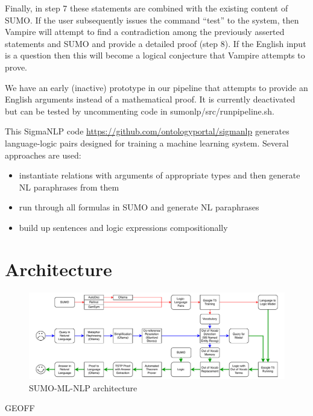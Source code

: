 \documentclass[runningheads]{llncs}
\begin{document}
Finally, in step 7 these statements are combined with the existing content of SUMO.   If the user subsequently issues the command ``test'' to the system, then Vampire will attempt to find a contradiction among the previously asserted statements and SUMO and provide a detailed proof (step 8).  If the English input is a question then this will become a logical conjecture that Vampire attempts to prove.

We have an early (inactive) prototype in our pipeline that attempts to provide an English arguments instead of a mathematical proof.  It is currently deactivated but can be tested by uncommenting code in sumonlp/src/runpipeline.sh.

This SigmaNLP code \url{https://github.com/ontologyportal/sigmanlp}
generates language-logic pairs designed for training a machine learning system. Several approaches are used:

\begin{itemize}
\item instantiate relations with arguments of appropriate types and then generate NL paraphrases from them
\item run through all formulas in SUMO and generate NL paraphrases
\item build up sentences and logic expressions compositionally
\end{itemize}

\section{Architecture}
\label{Architecture}

\begin{figure}
\includegraphics[width=\textwidth]{Architecture.pdf}
\caption{SUMO-ML-NLP architecture}
\label{ArchitecturePicture}
\end{figure}

GEOFF

\end{document}
